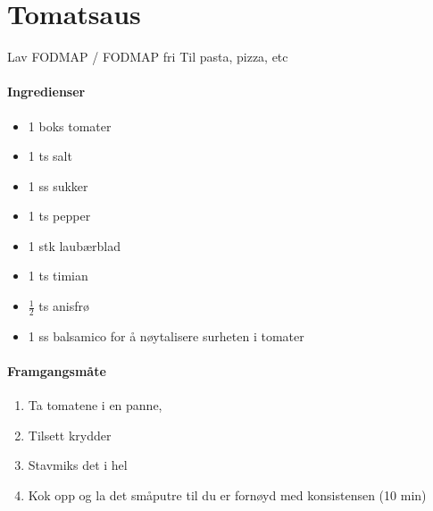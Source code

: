 \section{﻿Tomatsaus}
Lav FODMAP / FODMAP fri
Til pasta, pizza, etc

\paragraph{Ingredienser}
\begin{itemize}[noitemsep]
	\item 1 boks tomater
	\item 1 ts salt
	\item 1 ss sukker
	\item 1 ts pepper
	\item 1 stk laubærblad
	\item 1 ts timian
	\item $\frac{1}{2}$ ts anisfrø
	\item 1 ss balsamico for å nøytalisere surheten i tomater
\end{itemize}

\paragraph{Framgangsmåte}
\begin{enumerate}[noitemsep]
	\item Ta tomatene i en panne,
	\item Tilsett krydder
	\item Stavmiks det i hel
	\item Kok opp og la det småputre til du er fornøyd med konsistensen (10 min)
\end{enumerate}
